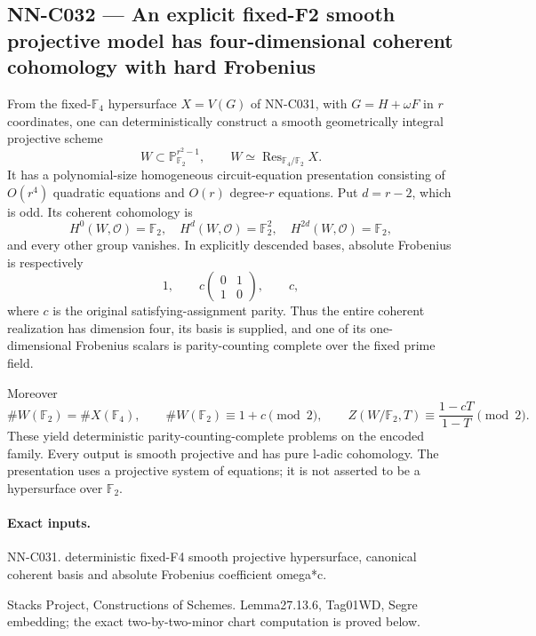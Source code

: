 \subsection{NN-C032 --- An explicit fixed-F2 smooth projective model has four-dimensional coherent cohomology with hard Frobenius}
\begin{proposition}[NN-C032]
From the fixed-$\mathbb F_4$ hypersurface $X=V(G)$ of NN-C031, with $G=H+\omega F$ in $r$ coordinates, one can deterministically construct a smooth geometrically integral projective scheme
\[
             W\subset\mathbb P^{r^2-1}_{\mathbb F_2},
              \qquad W\simeq\operatorname{Res}_{\mathbb F_4/\mathbb F_2}X.
\]
It has a polynomial-size homogeneous circuit-equation presentation consisting of $O(r^4)$ quadratic equations and $O(r)$ degree-$r$ equations. Put $d=r-2$, which is odd. Its coherent cohomology is
\[
 H^0(W,\mathcal O)=\mathbb F_2,\quad
 H^d(W,\mathcal O)=\mathbb F_2^2,\quad
 H^{2d}(W,\mathcal O)=\mathbb F_2,
\]
and every other group vanishes. In explicitly descended bases, absolute Frobenius is respectively
\[
                   1,\qquad
              c\begin{pmatrix}0&1\\1&0\end{pmatrix},
                   \qquad c,
\]
where $c$ is the original satisfying-assignment parity. Thus the entire coherent realization has dimension four, its basis is supplied, and one of its one-dimensional Frobenius scalars is parity-counting complete over the fixed prime field.

Moreover
\[
 \#W(\mathbb F_2)=\#X(\mathbb F_4),\qquad
 \#W(\mathbb F_2)\equiv1+c\pmod2,\qquad
 Z(W/\mathbb F_2,T)\equiv\frac{1-cT}{1-T}\pmod2.
\]
These yield deterministic parity-counting-complete problems on the encoded family. Every output is smooth projective and has pure l-adic cohomology. The presentation uses a projective system of equations; it is not asserted to be a hypersurface over $\mathbb F_2$.
\end{proposition}
\paragraph{Exact inputs.}
NN-C031. deterministic fixed-F4 smooth projective hypersurface, canonical coherent basis and absolute Frobenius coefficient omega*c.

Stacks Project, Constructions of Schemes. Lemma27.13.6, Tag01WD, Segre embedding; the exact two-by-two-minor chart computation is proved below.


